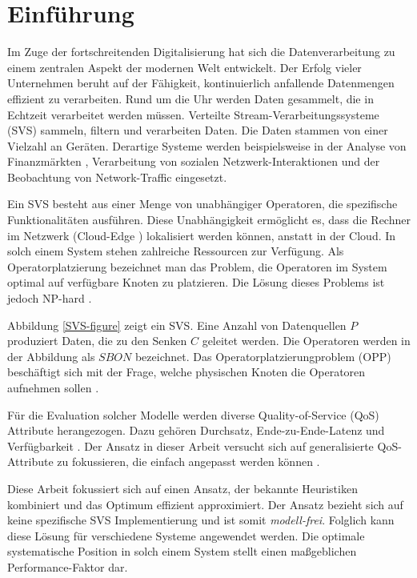 \documentclass{article}
\begin{document}
\section{Einführung}
Im Zuge der fortschreitenden Digitalisierung hat sich die Datenverarbeitung zu einem zentralen Aspekt der modernen Welt entwickelt.
Der Erfolg vieler Unternehmen beruht auf der Fähigkeit, kontinuierlich anfallende Datenmengen effizient zu verarbeiten.
Rund um die Uhr werden Daten gesammelt, die in Echtzeit verarbeitet werden müssen. 
Verteilte Stream-Verarbeitungssysteme (SVS) sammeln, filtern und verarbeiten Daten. Die Daten stammen von einer Vielzahl an Geräten.
Derartige Systeme werden beispielsweise in der Analyse von Finanzmärkten \cite{k5}, 
Verarbeitung von sozialen Netzwerk-Interaktionen und der Beobachtung von Network-Traffic \cite{k5} 
eingesetzt. 

Ein SVS besteht aus einer Menge von unabhängiger Operatoren, die spezifische
Funktionalitäten ausführen. Diese Unabhängigkeit ermöglicht es, dass die Rechner im Netzwerk (Cloud-Edge \cite{k6}) lokalisiert werden können, 
anstatt in der Cloud.
In solch einem System stehen zahlreiche Ressourcen zur Verfügung. 
Als Operatorplatzierung bezeichnet man das Problem, 
die Operatoren im System optimal auf verfügbare Knoten zu platzieren. 
Die Lösung dieses Problems ist jedoch NP-hard \cite{cardellini-optimal_operatorplc}.

Abbildung \ref{SVS-figure} zeigt ein SVS. Eine Anzahl von Datenquellen $P$ produziert Daten, die zu den Senken $C$ geleitet werden. Die Operatoren 
werden in der Abbildung als $SBON$ bezeichnet. Das Operatorplatzierungproblem (OPP) beschäftigt sich mit der Frage, 
welche physischen Knoten die Operatoren aufnehmen sollen \cite{network-aware-op}. 

Für die Evaluation solcher Modelle werden diverse Quality-of-Service (QoS) Attribute herangezogen. 
Dazu gehören Durchsatz, Ende-zu-Ende-Latenz und Verfügbarkeit \cite{efficient-operator-placement,cardellini-optimal_operatorplc}.
 Der Ansatz in dieser Arbeit versucht sich auf generalisierte QoS-Attribute 
zu fokussieren, die einfach angepasst werden können \cite{efficient-operator-placement}.

Diese Arbeit fokussiert sich auf einen Ansatz, der bekannte Heuristiken kombiniert und das Optimum effizient approximiert. 
Der Ansatz bezieht sich auf keine spezifische SVS Implementierung und ist somit \textit{modell-frei}. Folglich kann diese Lösung für verschiedene Systeme angewendet werden.
Die optimale systematische Position in solch einem System stellt einen maßgeblichen Performance-Faktor dar. 
\end{document}
